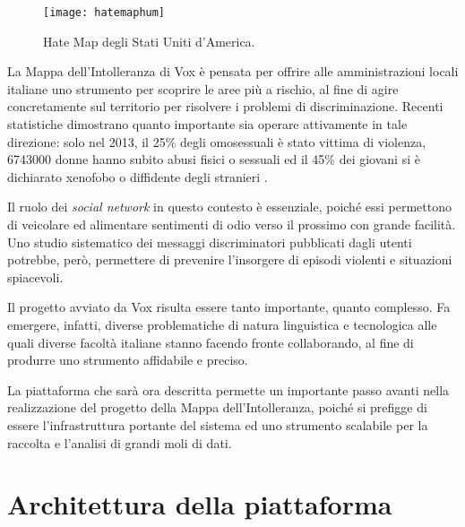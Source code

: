 \begin{figure}[ht]
\centering
\texttt{[image: hatemaphum]}
\caption{Hate Map degli Stati Uniti d'America\protect\footnotemark.}
\label{humbimg}
\end{figure}

La Mappa dell’Intolleranza di Vox è pensata per offrire alle amministrazioni locali italiane uno strumento per scoprire le aree più a rischio, al fine di agire concretamente sul 
territorio per risolvere i problemi di discriminazione. Recenti statistiche dimostrano quanto importante sia operare attivamente in tale direzione: solo nel 2013, il 25\% degli 
omosessuali è stato vittima di violenza, 6743000 donne hanno subito abusi fisici o sessuali ed il 45\% dei giovani si è dichiarato xenofobo o diffidente degli stranieri \cite{URL:vox}.

Il ruolo dei \textit{social network} in questo contesto è essenziale, poiché essi permettono di veicolare ed alimentare sentimenti di odio verso il prossimo con grande facilità. Uno studio 
sistematico dei messaggi discriminatori pubblicati dagli utenti potrebbe, però, permettere di prevenire l’insorgere di episodi violenti e situazioni spiacevoli.


Il progetto avviato da Vox risulta essere tanto importante, quanto complesso. Fa emergere, infatti, diverse problematiche di natura linguistica e tecnologica alle quali diverse 
facoltà italiane stanno facendo fronte collaborando, al fine di produrre uno strumento affidabile e preciso.

La piattaforma che sarà ora descritta permette un importante passo avanti nella realizzazione del progetto della Mappa dell’Intolleranza, poiché si prefigge di essere 
l’infrastruttura portante del sistema ed uno strumento scalabile per la raccolta e l’analisi di grandi moli di dati.


\section{Architettura della piattaforma}


